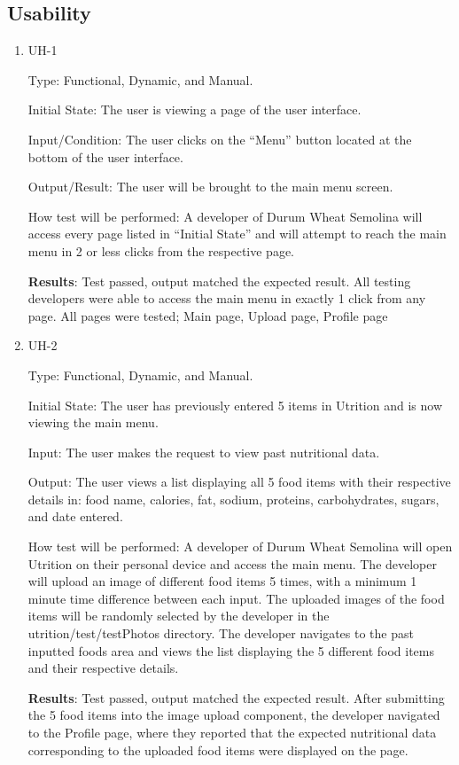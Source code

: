 \documentclass[12pt, titlepage]{article}
\begin{document}
	\subsection{Usability}
	\begin{enumerate}
		
		\item{UH-1}
		
		Type: Functional, Dynamic, and Manual.
		
		Initial State: The user is viewing a page of the user interface.
		
		Input/Condition: The user clicks on the “Menu” button located at the bottom of the user interface.
		
		Output/Result: The user will be brought to the main menu screen.
		
		How test will be performed: A developer of Durum Wheat Semolina will access every page listed in “Initial State” and will attempt to reach the main menu in 2 or less clicks from the respective page.
		
		\textbf{Results}: Test passed, output matched the expected result. All testing developers were able to access the main menu in exactly 1 click from any page. All pages were tested; Main page, Upload page, Profile page
		
		
		\item{UH-2}
		
		Type: Functional, Dynamic, and Manual.
		
		Initial State: The user has previously entered 5 items in Utrition and is now viewing the main menu.
		
		Input: The user makes the request to view past nutritional data.
		
		Output: The user views a list displaying all 5 food items with their respective details in: food name, calories, fat, sodium, proteins, carbohydrates, sugars, and date entered.
		
		How test will be performed: A developer of Durum Wheat Semolina will open Utrition on their personal device and access the main menu. The developer will upload an image of different food items 5 times, with a minimum 1 minute time difference between each input. The uploaded images of the food items will be randomly selected by the developer in the utrition/test/testPhotos directory. The developer navigates to the past inputted foods area and views the list displaying the 5 different food items and their respective details.
		
		\textbf{Results}: Test passed, output matched the expected result. After submitting the 5 food items into the image upload component, the developer navigated to the Profile page, where they reported that the expected nutritional data corresponding to the uploaded food items were displayed on the page.
		

\end{enumerate}
\end{document}
